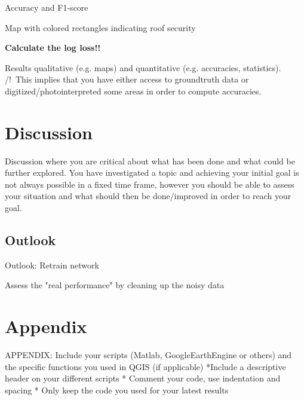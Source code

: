 \documentclass[11pt]{article}
\begin{document}
	
	Accuracy and F1-score
	
	Map with colored rectangles indicating roof security
	
	
	\textbf{Calculate the log loss!!}
	
	
	Results qualitative (e.g. maps) and quantitative (e.g. accuracies, statistics). /!\ This implies that you have either access to groundtruth data or digitized/photointerpreted some areas in order to compute accuracies.
	
	
	\section{Discussion}
	\label{sec:discussion}
	Discussion where you are critical about what has been done and what could be further explored. You have investigated a topic and achieving your initial goal is not always possible in a fixed time frame, however you should be able to assess your situation and what should then be done/improved in order to reach your goal.
	
	\subsection{Outlook}
	Outlook: Retrain network
	
	Assess the "real performance" by cleaning up the noisy data
	
	\section{Appendix}
	APPENDIX: Include your scripts (Matlab, GoogleEarthEngine or others) and the specific functions you used in QGIS (if applicable)
	*Include a descriptive header on your different scripts
	* Comment your code, use indentation and spacing
	* Only keep the code you used for your latest results
	
	
	
	 
	
	
\end{document}
